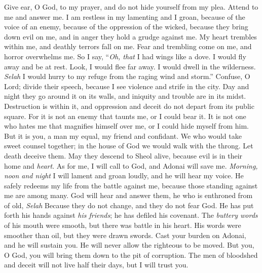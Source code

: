\begin{biblechapter} %
 Give ear, O God, to my prayer, 
and do not hide yourself from my plea.
\verse Attend to me and answer me. 
I am restless in my lamenting and I groan,
\verse because of the voice of an enemy, 
because of the oppression of the wicked, 
because they bring down evil on me, 
and in anger they hold a grudge against me.
\verse My heart trembles within me, 
and deathly terrors fall on me.
\verse Fear and trembling come on me, 
and horror overwhelms me.
\verse So I say, “\textit{Oh, that} I had wings like a dove. 
I would fly away and be at rest.
\verse Look, I would flee far away. 
I would dwell in the wilderness. \textit{Selah}
\verse I would hurry to my refuge 
from the raging wind and storm.”
\verse Confuse, O Lord; divide their speech, 
because I see violence and strife in the city.
\verse Day and night they go around it on its walls, 
and iniquity and trouble are in its midst.
\verse Destruction is within it, 
and oppression and deceit 
do not depart from its public square.
\verse For it is not an enemy that taunts me, 
or I could bear it. 
It is not one who hates me that magnifies himself over me, 
or I could hide myself from him.
\verse But it is you, a man my equal, 
my friend and confidant.
\verse We who would take sweet counsel together; 
in the house of God 
we would walk with the throng.
\verse Let death deceive them. May they descend to Sheol alive, 
because evil is in their home and \textit{heart}.
\verse As for me, I will call to God, 
and Adonai will save me.
\verse \textit{Morning, noon and night} I will lament and groan loudly, 
and he will hear my voice.
\verse He safely redeems my life from the battle against me, 
because those standing against me are among many.
\verse God will hear and answer them, 
he who is enthroned from of old, \textit{Selah} 
Because they do not change, 
and they do not fear God.
\verse He has put forth his hands against \textit{his friends}; 
he has defiled his covenant.
\verse The \textit{buttery words} of his mouth were smooth, 
but there was battle in his heart. 
His words were smoother than oil, 
but they were drawn swords.
\verse Cast your burden on Adonai, 
and he will sustain you. 
He will never allow the righteous to be moved.
\verse But you, O God, you will bring them down to the pit of corruption. 
The men of bloodshed and deceit will not live half their days, 
but I will trust you.
\end{biblechapter}


